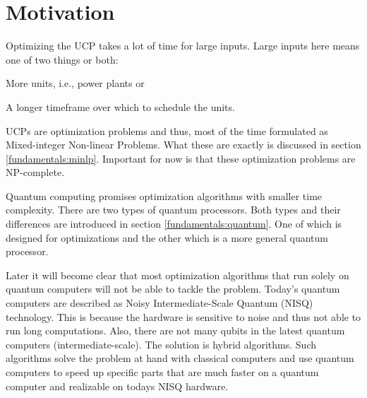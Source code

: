 \section{Motivation}

Optimizing the UCP takes a lot of time for large inputs.
Large inputs here means one of two things or both:
\begin{enumerate*}[label=(\roman*)]
  \item More units, i.e., power plants or
  \item A longer timeframe over which to schedule the units.
\end{enumerate*}
UCPs are optimization problems and thus, most of the time formulated as Mixed-integer Non-linear Problems.
\cite{Baldick1995}
What these are exactly is discussed in section \ref{fundamentals:minlp}.
Important for now is that these optimization problems are NP-complete.
\cite{Li2005, Bienstock1996}

Quantum computing promises optimization algorithms with smaller time complexity.
\cite{Portnov2000, Ahuja1999, Gilliam2019, Ajagekar2020, Shaydulin2019}
There are two types of quantum processors.
Both types and their differences are introduced in section \ref{fundamentals:quantum}.
One of which is designed for optimizations and the other which is a more general quantum processor.

Later it will become clear that most optimization algorithms that run solely on quantum computers will not be able to tackle the problem.
Today's quantum computers are described as Noisy Intermediate-Scale Quantum (NISQ) technology.
This is because the hardware is sensitive to noise and thus not able to run long computations.
Also, there are not many qubits in the latest quantum computers (intermediate-scale).
\cite{Leymann2020}
The solution is hybrid algorithms.
Such algorithms solve the problem at hand with classical computers and use quantum computers to speed up specific parts that are much faster on a quantum computer and realizable on todays NISQ hardware.
\cite{Ajagekar2020, Shaydulin2019}
